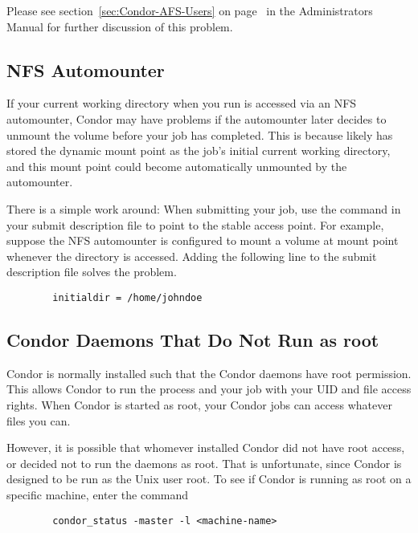 Please see section~\ref{sec:Condor-AFS-Users} on
page~\pageref{sec:Condor-AFS-Users} in the Administrators Manual for
further discussion of this problem.

\subsection{NFS Automounter}

If your current working directory when you run 
is accessed via an NFS automounter, Condor may have problems if the
automounter later decides to unmount the volume before your job has
completed.
This is because  likely has stored the
dynamic mount point as the job's initial current working directory, and
this mount point could become automatically unmounted by the
automounter.

There is a simple work around: When submitting your job, use the 
 command in your submit description file to point to
the stable access point.
For example,
suppose the NFS automounter is configured to mount a volume at mount point
whenever the directory  is accessed.
Adding the following line to the
submit description file solves the problem.
\begin{verbatim}
        initialdir = /home/johndoe
\end{verbatim}

\subsection{Condor Daemons That Do Not Run as root}

Condor is normally installed such that the Condor daemons have root
permission.
This allows Condor to run the  
process and
your job with your UID and file access rights.
When Condor
is started as root, your Condor jobs can access whatever files you can.

However, it is possible that whomever installed Condor 
did not have root access, or
decided not to run the daemons as root.
That is unfortunate,
since Condor is designed to be run as the Unix user root.
To see if Condor is
running as root on a specific machine, enter the command
\begin{verbatim}
        condor_status -master -l <machine-name>
\end{verbatim}

